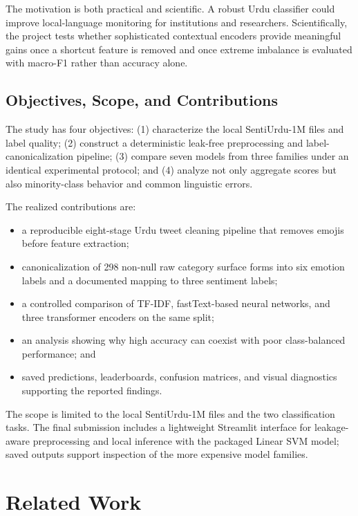 \documentclass[conference]{IEEEtran}
\begin{document}
The motivation is both practical and scientific. A robust Urdu classifier could improve local-language monitoring for institutions and researchers. Scientifically, the project tests whether sophisticated contextual encoders provide meaningful gains once a shortcut feature is removed and once extreme imbalance is evaluated with macro-F1 rather than accuracy alone.

\subsection{Objectives, Scope, and Contributions}
The study has four objectives: (1) characterize the local SentiUrdu-1M files and label quality; (2) construct a deterministic leak-free preprocessing and label-canonicalization pipeline; (3) compare seven models from three families under an identical experimental protocol; and (4) analyze not only aggregate scores but also minority-class behavior and common linguistic errors.

The realized contributions are:
\begin{itemize}[leftmargin=*,nosep]
    \item a reproducible eight-stage Urdu tweet cleaning pipeline that removes emojis before feature extraction;
    \item canonicalization of 298 non-null raw category surface forms into six emotion labels and a documented mapping to three sentiment labels;
    \item a controlled comparison of TF-IDF, fastText-based neural networks, and three transformer encoders on the same split;
    \item an analysis showing why high accuracy can coexist with poor class-balanced performance; and
    \item saved predictions, leaderboards, confusion matrices, and visual diagnostics supporting the reported findings.
\end{itemize}

The scope is limited to the local SentiUrdu-1M files and the two classification tasks. The final submission includes a lightweight Streamlit interface for leakage-aware preprocessing and local inference with the packaged Linear SVM model; saved outputs support inspection of the more expensive model families.

\section{Related Work}
\end{document}
